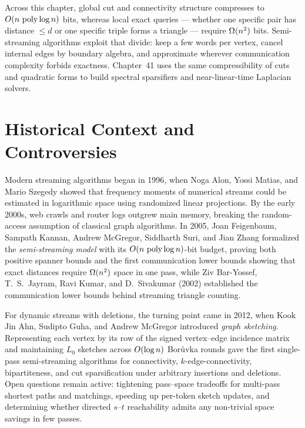 \begin{aestheticbox}
Across this chapter, global cut and connectivity structure compresses to
$O(n\,\operatorname{poly}\log n)$ bits, whereas local exact queries --- whether one specific
pair has distance $\le d$ or one specific triple forms a triangle --- require
$\Omega(n^2)$ bits. Semi-streaming algorithms exploit that divide: keep a few words
per vertex, cancel internal edges by boundary algebra, and approximate wherever
communication complexity forbids exactness. Chapter~41 uses the same
compressibility of cuts and quadratic forms to build spectral sparsifiers and
near-linear-time Laplacian solvers.
\end{aestheticbox}

\section{Historical Context and Controversies}

\begin{historybox}
Modern streaming algorithms began in 1996, when Noga Alon, Yossi Matias, and Mario Szegedy showed that frequency moments of numerical streams could be estimated in logarithmic space using randomized linear projections. By the early 2000s, web crawls and router logs outgrew main memory, breaking the random-access assumption of classical graph algorithms. In 2005, Joan Feigenbaum, Sampath Kannan, Andrew McGregor, Siddharth Suri, and Jian Zhang formalized the \emph{semi-streaming model} with its $O(n\,\operatorname{poly}\log n)$-bit budget, proving both positive spanner bounds and the first communication lower bounds showing that exact distances require $\Omega(n^2)$ space in one pass, while Ziv Bar-Yossef, T.~S.\ Jayram, Ravi Kumar, and D.~Sivakumar (2002) established the communication lower bounds behind streaming triangle counting.

For dynamic streams with deletions, the turning point came in 2012, when Kook Jin Ahn, Sudipto Guha, and Andrew McGregor introduced \emph{graph sketching}. Representing each vertex by its row of the signed vertex--edge incidence matrix and maintaining $L_0$ sketches across $O(\log n)$ Bor\r{u}vka rounds gave the first single-pass semi-streaming algorithms for connectivity, $k$-edge-connectivity, bipartiteness, and cut sparsification under arbitrary insertions and deletions. Open questions remain active: tightening pass--space tradeoffs for multi-pass shortest paths and matchings, speeding up per-token sketch updates, and determining whether directed $s$--$t$ reachability admits any non-trivial space savings in few passes.
\end{historybox}

